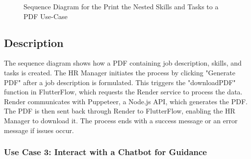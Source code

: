 \begin{figure}[H]
    \centering
    \caption{ Sequence Diagram for the Print the Nested Skills and Tasks to a PDF Use-Case }
    \label{fig:UseCase2Sprint3_Sequence_Diagram}
\end{figure}

\subsection*{Description}
The sequence diagram shows how a PDF containing job description, skills, and tasks is created. The HR Manager initiates the process by clicking "Generate PDF" after a job description is formulated. This triggers the "downloadPDF" function in FlutterFlow, which requests the Render service to process the data. Render communicates with Puppeteer, a Node.js API, which generates the PDF. The PDF is then sent back through Render to FlutterFlow, enabling the HR Manager to download it. The process ends with a success message or an error message if issues occur.

\subsubsection{Use Case 3: Interact with a Chatbot for Guidance} 

